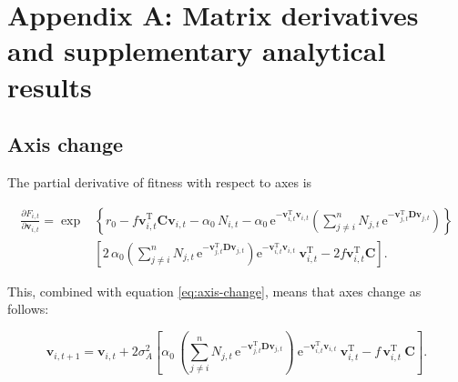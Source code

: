 
\renewcommand{\thefigure}{A\arabic{figure}}
\renewcommand{\theequation}{A\arabic{equation}}
\renewcommand{\thetable}{A\arabic{table}}
\setcounter{equation}{0}
\setcounter{figure}{0}
\setcounter{table}{0}


\section*{Appendix A: Matrix derivatives and supplementary analytical results}


\subsection*{Axis change}

The partial derivative of fitness with respect to axes is

\begin{equation*}
\begin{split}
    \frac{ \partial F_{i,t} }{ \partial \mathbf{v}_{i,t} } =
        \exp & \left\{
            r_0
            - f \mathbf{v}_{i,t}^{\textrm{T}} \mathbf{C} \mathbf{v}_{i,t}
            - \alpha_0 \, N_{i,t}
            - \alpha_0 \,
                \textrm{e}^{- \mathbf{v}_{i,t}^{\textrm{T}} \mathbf{v}_{i,t}}
            \left(
                \sum_{j \ne i}^{n}{ N_{j,t} \, \textrm{e}^{
                - \mathbf{v}_{j,t}^{\textrm{T}}
                \mathbf{D} \mathbf{v}_{j,t} } }
            \right)
        \right\} \\
        & \left[
            2 \, \alpha_0 \left(
                \sum_{j \ne i}^{n}{ N_{j,t} \, \textrm{e}^{
                - \mathbf{v}_{j,t}^{\textrm{T}}
                \mathbf{D} \mathbf{v}_{j,t} } }
            \right)
                \textrm{e}^{- \mathbf{v}_{i,t}^{\textrm{T}} \mathbf{v}_{i,t}} \:
                \mathbf{v}_{i,t}^{\textrm{T}}
            - 2 f \mathbf{v}_{i,t}^{\textrm{T}} \mathbf{C}
        \right]
    \textrm{.}
\end{split}
\end{equation*}


This, combined with equation \ref{eq:axis-change}, means that axes change as follows:

\begin{equation} \label{eq:axes-change-full}
    \mathbf{v}_{i,t+1} = \mathbf{v}_{i,t} + 2 \sigma_A^2
    \left[
        \alpha_0 \, \left(
            \sum_{j \ne i}^{n}{ N_{j,t} \, \textrm{e}^{
            - \mathbf{v}_{j,t}^{\textrm{T}}
            \mathbf{D} \mathbf{v}_{j,t} } }
        \right) \:
            \textrm{e}^{- \mathbf{v}_{i,t}^{\textrm{T}} \mathbf{v}_{i,t}} \:
            \mathbf{v}_{i,t}^{\textrm{T}}
        - f \, \mathbf{v}_{i,t}^{\textrm{T}} \: \mathbf{C}
    \right]
    \textrm{.}
\end{equation}


